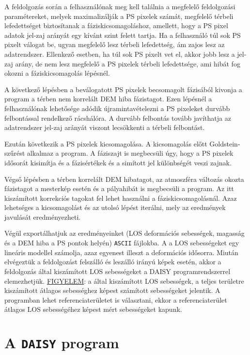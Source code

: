 \documentclass[12pt]{report}
\numberwithin{equation}{section}
\numberwithin{table}{section}
\numberwithin{figure}{section}
\begin{document}
A feldolgozás során a felhasználónak meg kell találnia a megfelelő feldolgozási paramétereket, melyek maximalizálják a PS pixelek számát, megfelelő térbeli lefedettséget biztosítanak a fáziskicsomagoláshoz, amellett, hogy a PS pixel adatok jel-zaj arányát egy kívánt szint felett tartja. Ha a felhasználó túl sok PS pixelt válogat be, ugyan megfelelő lesz térbeli lefedettség, ám zajos lesz az adatrendszer. Ellenkező esetben, ha túl sok PS pixelt vet el, akkor jobb lesz a jel-zaj arány, de nem lesz megfelelő a PS pixelek térbeli lefedettsége, ami hibát fog okozni a fáziskicsomagolás lépésnél.

A következő lépésben a beválogatott PS pixelek becsomagolt fázisából kivonja a program a térben nem korrelált DEM hiba fázistagot. Ezen lépésnél a felhasználónak lehetősége adódik újramintavételezni a PS pixeleket durvább felbontással rendelkező rácshálóra. A durvább felbontás tovább javíthatja az adatrendszer jel-zaj arányát viszont lecsökkenti a térbeli felbontást.

Ezután következik a PS pixelek kicsomagolása. A kicsomagolás előtt Goldstein-szűrést alkalmaz a program. A fáziszajt is megbecsüli úgy, hogy a PS pixelek idősorát kisimítja és a fázisértékek és a simított jel különbségét veszi zajnak.

Végső lépésben a térben korrelált DEM hibatagot, az atmoszféra változás okozta fázistagot a mesterkép esetén és a pályahibát is megbecsüli a program. Az itt kiszámított korrekciós tagokat fel lehet használni a fáziskicsomagolásnál. Azaz lehetséges a kicsomagolást és az utolsó lépést iterálni, mely az eredmények javulását eredményezheti.

Végül exportálhatjuk az eredményeinket (LOS deformációs sebességek, magasság és a DEM hiba a PS pontok helyén) \texttt{ASCII} fájlokba. A \stamps a LOS sebességeket egy lineáris modellel számolja, azaz egyenest illeszt a deformációs idősorra. Miután elvégeztük a feldolgozást  felszálló és leszálló irányú képek esetén, akkor a \stamps feldolgozás által kiszámított LOS sebességeket a DAISY programrendszerrel elemezhetjük. \underline{FIGYELEM}: a \stamps által kiszámított LOS sebességek, a teljes területre kiszámított átlagos sebességhez képest számított sebességeket jelentik. A programban lehet referenciaterületet is választani, ekkor a referenciaterület átlagos LOS sebességéhez képest mért sebességeket kapunk.

\section{A \texttt{DAISY} program}\label{daisy}
\end{document}
